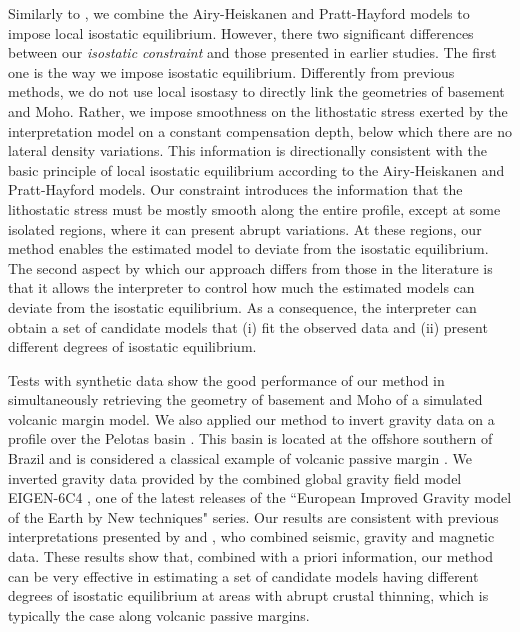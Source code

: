 \documentclass[manuscript]{geophysics}
\begin{document}
Similarly to \citet{ferderer-etal2017}, we combine the Airy-Heiskanen and Pratt-Hayford
models to impose local isostatic equilibrium. However, there two significant differences
between our \textit{isostatic constraint} and those presented in earlier studies.
The first one is the way we impose isostatic equilibrium. Differently from previous 
methods, we do not use local isostasy to directly link the geometries of basement and Moho.
Rather, we impose smoothness on the lithostatic stress exerted by the interpretation 
model on a constant compensation depth, below which there are no lateral density variations.
This information is directionally consistent with the basic principle of 
local isostatic equilibrium according to the Airy-Heiskanen and Pratt-Hayford models.
Our constraint introduces the information that the lithostatic stress must be mostly 
smooth along the entire profile, except at some isolated regions, where it can present abrupt
variations. At these regions, our method enables the estimated model to deviate from the 
isostatic equilibrium.
The second aspect by which our approach differs from those in the literature
is that it allows the interpreter to control how much the 
estimated models can deviate from the isostatic equilibrium.
As a consequence, the interpreter can obtain a set of candidate models 
that (i) fit the observed data and (ii) present different degrees of isostatic equilibrium.

Tests with synthetic data show the good performance of our method in simultaneously
retrieving the geometry of basement and Moho of a simulated volcanic margin
model. We also applied our method to invert 
gravity data on a profile over the Pelotas basin \citep{stica-etal2014}. This basin is
located at the offshore southern of Brazil and is considered a classical example 
of volcanic passive margin \citep{geoffroy2005}. 
We inverted gravity data provided by the combined global gravity field model EIGEN-6C4
\citep{forste2014}, one of the latest releases of the ``European Improved Gravity model of 
the Earth by New techniques" series.
Our results are consistent with previous interpretations presented by \citet{stica-etal2014} and
\citet{zalan2015}, who combined seismic, gravity and magnetic data.
These results show that, combined with a priori information, our method can be very effective in 
estimating a set of candidate models having different degrees of isostatic equilibrium at
areas with abrupt crustal thinning, which is typically the case along volcanic passive margins.
\end{document}
